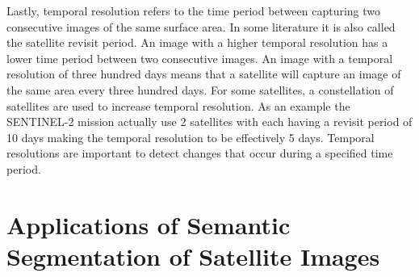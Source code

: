 \FloatBarrier
Lastly, temporal resolution refers to the time period between capturing two consecutive images of the same surface area. In some literature it is also called the satellite revisit period. An image with a higher temporal resolution has a lower time period between two consecutive images. An image with a temporal resolution of three hundred days means that a satellite will capture an image of the same area every three hundred days.  For some satellites, a constellation of satellites are used to increase temporal resolution. As an example the SENTINEL-2 mission actually use 2 satellites with each having a revisit period of 10 days making the temporal resolution to be effectively 5 days. Temporal resolutions are important to detect changes that occur during a specified time period.

\section{Applications of Semantic Segmentation of Satellite Images}

